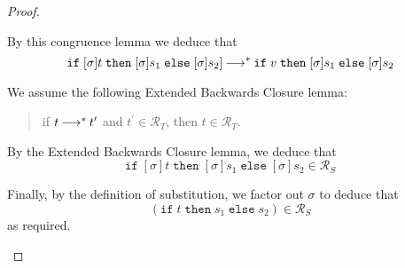 \documentclass[11pt,letterpaper]{article}
\renewcommand{\R}{\mathcal{R}}
\newcommand{\ifthenelse}[3]{%
  \mathtt{if}\;#1\;\mathtt{then}\;#2\;\mathtt{else}\;#3%
}
\begin{document}
\begin{enumerate}
\begin{proof}
\begin{description}
          By this congruence lemma we deduce that
          \begin{equation*}
            \ifthenelse{[\sigma]t}{[\sigma]s_1}{[\sigma]s_2]}
            \evalto^*
            \ifthenelse{v}{[\sigma]s_1}{[\sigma]s_2}
          \end{equation*}

          We assume the following Extended Backwards Closure lemma:
          \begin{quote}
            if $t \mathbin{\longrightarrow}^* t^\prime$ and $t^\prime \in \R_T$,
            then $t \in \R_T$.
          \end{quote}

          By the Extended Backwards Closure lemma, we deduce that
          \begin{equation*}
            \ifthenelse{[\sigma]t}{[\sigma]s_1}{[\sigma]s_2} \in \R_S
          \end{equation*}

          Finally, by the definition of substitution, we factor out $\sigma$
          to deduce that
          \begin{equation*}
            [\sigma](\ifthenelse{t}{s_1}{s_2}) \in \R_S
          \end{equation*}
          as required.
      \end{description}
    \end{proof}
\end{enumerate}
\end{document}
